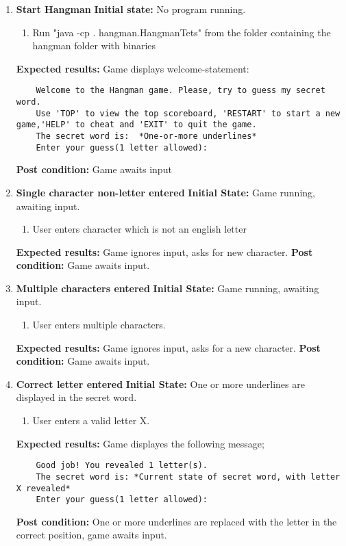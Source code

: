 \documentclass{article}
\begin{document}
	\begin{enumerate}

	\item \textbf{Start Hangman}\newline
	\textbf{Initial state:} No program running.
	\begin{enumerate}
	\item Run "java -cp . hangman.HangmanTets" from the folder containing the hangman folder with binaries
	\end{enumerate}
	\textbf{Expected results:} Game displays welcome-statement:
	\begin{verbatim}
	Welcome to the Hangman game. Please, try to guess my secret word.
	Use 'TOP' to view the top scoreboard, 'RESTART' to start a new game,'HELP' to cheat and 'EXIT' to quit the game.
	The secret word is:  *One-or-more underlines*
	Enter your guess(1 letter allowed):
	\end{verbatim}
	\textbf{Post condition:} Game awaits input

	\item \textbf{Single character non-letter entered}\newline
	\textbf{Initial State:} Game running, awaiting input.
	\begin{enumerate}
	\item User enters character which is not an english letter
	\end{enumerate}
	\textbf{Expected results:} Game ignores input, asks for new character.\newline
	\textbf{Post condition:} Game awaits input.

	\item \textbf{Multiple characters entered}\newline
	\textbf{Initial State:} Game running, awaiting input.
	\begin{enumerate}
	\item User enters multiple characters.
	\end{enumerate}
	\textbf{Expected results:} Game ignores input, asks for a new character.\newline
	\textbf{Post condition:} Game awaits input.

	\item \textbf{Correct letter entered}\newline
	\textbf{Initial State:} One or more underlines are displayed in the secret word.
	\begin{enumerate}
	\item User enters a valid letter X.
	\end{enumerate}
	\textbf{Expected results:} Game displayes the following message; 
	\begin{verbatim}
	Good job! You revealed 1 letter(s).
	The secret word is: *Current state of secret word, with letter X revealed*
	Enter your guess(1 letter allowed):
	\end{verbatim}
	\textbf{Post condition:} One or more underlines are replaced with the letter in the correct position, game awaits input.


\end{enumerate}
\end{document}

